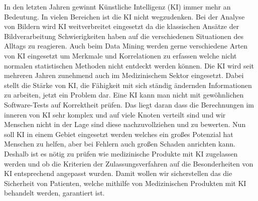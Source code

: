 In den letzten Jahren gewinnt Künstliche Intelligenz (KI) immer mehr an Bedeutung. In vielen Bereichen ist die KI nicht wegzudenken. Bei der Analyse von Bildern wird KI weitverbreitet eingesetzt da die klassischen Ansätze der Bildverarbeitung Schwierigkeiten haben auf die verschiedenen Situationen des Alltags zu reagieren. Auch beim Data Mining werden gerne verschiedene Arten von KI eingesetzt um Merkmale und Korrelationen zu erfassen welche nicht normalen statistischen Methoden nicht entdeckt werden können.
Die KI wird seit mehreren Jahren zunehmend auch im Medizinischem Sektor eingesetzt. Dabei stellt die Stärke von KI, die Fähigkeit mit sich ständig ändernden Informationen zu arbeiten, jetzt ein Problem dar. Eine KI kann man nicht mit gewöhnlichen Software-Tests auf Korrektheit prüfen. Das liegt daran dass die Berechnungen im inneren von KI sehr komplex und auf viele Knoten verteilt sind und wir Menschen nicht in der Lage sind diese nachzuvollziehen und zu bewerten. Nun soll KI in einem Gebiet eingesetzt werden welches ein großes Potenzial hat Menschen zu helfen, aber bei Fehlern auch großen Schaden anrichten kann.
Deshalb ist es nötig zu prüfen wie medizinische Produkte mit KI zugelassen werden und ob die Kriterien der Zulassungsverfahren auf die Besonderheiten von KI entsprechend angepasst wurden. Damit wollen wir sicherstellen das die Sicherheit von Patienten, welche mithilfe von Medizinischen Produkten mit KI behandelt werden, garantiert ist.